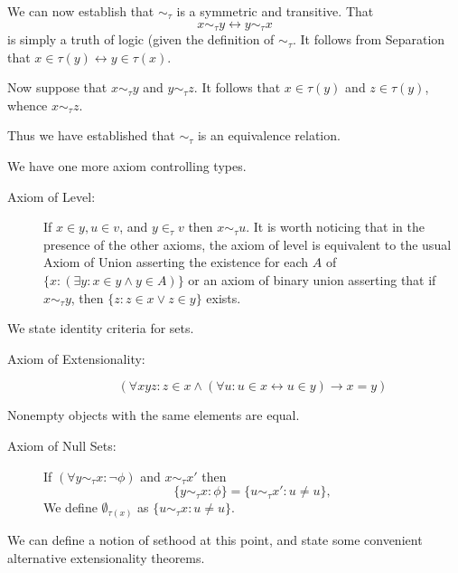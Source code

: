 \documentclass[12pt]{article}
\begin{document}
We can now establish that $\sim_\tau$ is a symmetric and transitive.  That $$x \sim_\tau y \leftrightarrow y \sim_\tau x$$ is simply a truth of logic (given the definition of $\sim_\tau$.
It follows from Separation that $x \in \tau(y) \leftrightarrow y \in \tau(x)$.

Now suppose that $x \sim_\tau y$ and $y \sim_\tau z$.  It follows that $x \in \tau(y)$ and $z \in \tau(y)$, whence $x \sim_\tau z$.

Thus we have established that $\sim_\tau$ is an equivalence relation.

We have one more axiom controlling types.  

\begin{description}

\item[Axiom of Level:]  If $x \in y, u \in v$, and $y \in_\tau v$ then $x \sim_\tau u$.  It is worth noticing that in the presence of the other axioms, the axiom of level is equivalent to
the usual Axiom of Union asserting the existence for each $A$ of $\{x:(\exists y:x \in y \wedge y \in A)\}$ or an axiom of binary union asserting that if $x \sim_\tau y$, then 
$\{z:z \in x \vee z \in y\}$ exists.

\end{description}

We state identity criteria for sets.

\begin{description}

\item[Axiom of Extensionality:]  $$(\forall xyz:z \in x \wedge (\forall  u:u \in x \leftrightarrow u \in y) \rightarrow x=y)$$

\end{description}

Nonempty objects with the same elements are equal.

\begin{description}

\item[Axiom of Null Sets:]  If $(\forall y \sim_\tau x:\neg \phi)$ and $x \sim_\tau x'$ then $$\{y \sim_\tau x:\phi\} = \{u \sim_\tau x':u \neq u\},$$ We define $\emptyset_{\tau(x)}$ as $\{u \sim_\tau x:u \neq u\}$.

\end{description}

We can define a notion of sethood at this point, and state some convenient alternative extensionality theorems.
\end{document}

